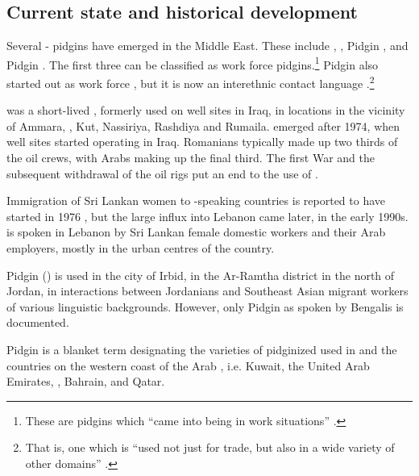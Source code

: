 \documentclass[output=paper]{langsci/langscibook}
\begin{document}
 \subsection{Current state and historical development}


Several - pidgins have emerged in the Middle East. These include  , ,  Pidgin , and  Pidgin . The first three can be classified as work force pidgins.\footnote{These are pidgins which “came into being in work situations” \citep[28]{Bakker1995}.}  Pidgin  also started out as work force  \citep[83]{Smart1990}, but it is now an interethnic contact language \citep[13]{Avram2014Pidgin}.\footnote{That is, one which is “used not just for trade, but also in a wide variety of other domains” \citep[28]{Bakker1995}.}

  \citep{Avram2010} was a short-lived , formerly used on  well sites in Iraq, in locations in the vicinity of Ammara, , Kut, Nassiriya, Rashdiya and Rumaila.   emerged after 1974, when  well sites started operating in Iraq. Romanians typically made up two thirds of the oil crews, with Arabs making up the final third. The first  War and the subsequent withdrawal of the  oil rigs put an end to the use of  . 

Immigration of Sri Lankan women to -speaking countries is reported to have started in 1976 \citep[16]{Bizri2010}, but the large influx into Lebanon came later, in the early 1990s.  is spoken in Lebanon by Sri Lankan female domestic workers and their Arab employers, mostly in the urban centres of the country. 

   Pidgin  (\citealt{Al-Salman2013}) is used in the city of Irbid, in the Ar-Ramtha district in the north of Jordan, in interactions between Jordanians and Southeast Asian migrant workers of various linguistic backgrounds. However, only  Pidgin  as spoken by Bengalis is documented.  

 Pidgin  is a blanket term designating the varieties of pidginized  used in  and the countries on the western coast of the Arab , i.e. Kuwait, the United Arab Emirates, , Bahrain, and Qatar. 
\end{document}
